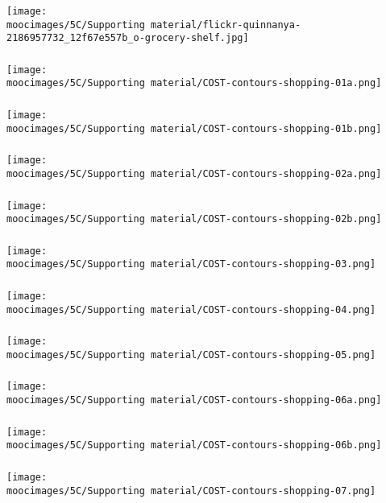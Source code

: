 \documentclass[handout,11pt,aspectratio=169,mathserif]{beamer}
\begin{document}

\begin{frame}\frametitle{}
	\centerline{\texttt{[image: \\moocimages/5C/Supporting material/flickr-quinnanya-2186957732\_12f67e557b\_o-grocery-shelf.jpg]}}
\end{frame}
\begin{frame}\frametitle{}
	\centerline{\texttt{[image: \\moocimages/5C/Supporting material/COST-contours-shopping-01a.png]}}
\end{frame}
\begin{frame}\frametitle{}
	\centerline{\texttt{[image: \\moocimages/5C/Supporting material/COST-contours-shopping-01b.png]}}
\end{frame}
\begin{frame}\frametitle{}
	\centerline{\texttt{[image: \\moocimages/5C/Supporting material/COST-contours-shopping-02a.png]}}
\end{frame}
\begin{frame}\frametitle{}
	\centerline{\texttt{[image: \\moocimages/5C/Supporting material/COST-contours-shopping-02b.png]}}
\end{frame}
\begin{frame}\frametitle{}
	\centerline{\texttt{[image: \\moocimages/5C/Supporting material/COST-contours-shopping-03.png]}}
\end{frame}
\begin{frame}\frametitle{}
	\centerline{\texttt{[image: \\moocimages/5C/Supporting material/COST-contours-shopping-04.png]}}
\end{frame}
\begin{frame}\frametitle{}
	\centerline{\texttt{[image: \\moocimages/5C/Supporting material/COST-contours-shopping-05.png]}}
\end{frame}
\begin{frame}\frametitle{}
	\centerline{\texttt{[image: \\moocimages/5C/Supporting material/COST-contours-shopping-06a.png]}}
\end{frame}
\begin{frame}\frametitle{}
	\centerline{\texttt{[image: \\moocimages/5C/Supporting material/COST-contours-shopping-06b.png]}}
\end{frame}
\begin{frame}\frametitle{}
	\centerline{\texttt{[image: \\moocimages/5C/Supporting material/COST-contours-shopping-07.png]}}
\end{frame}
\end{document}
